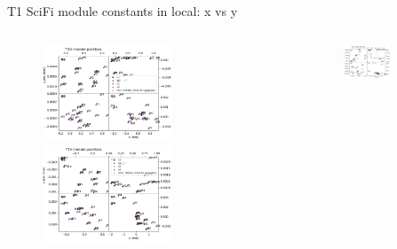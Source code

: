 \documentclass[aspectratio=1610, 12pt]{beamer}
\begin{document}
\begin{frame}{T1 SciFi module constants in local: x vs y}
  \begin{columns}
    \begin{column}[c]{0.5\textwidth}
      \begin{figure}
        \includegraphics[width=0.61\textwidth]{plots/out_x_y_pos/retest_x_vs_y_local_T1U.pdf}
        \includegraphics[width=0.61\textwidth]{plots/out_x_y_pos/retest_x_vs_y_local_T1V.pdf}
      \end{figure}
    \end{column}
    \begin{column}[c]{0.5\textwidth}
      \begin{figure}
        \includegraphics[width=0.61\textwidth]{plots/out_x_y_pos/retest_x_vs_y_local_T1X1.pdf}

\end{figure}
\end{column}
\end{columns}
\end{frame}
\end{document}
